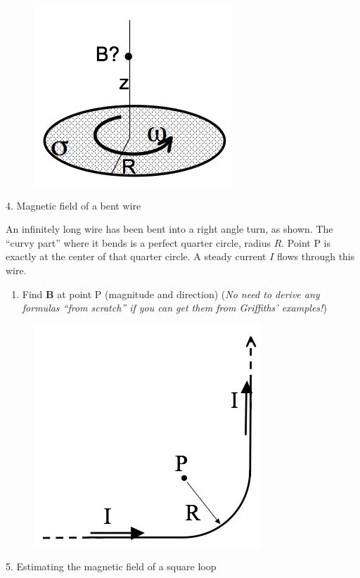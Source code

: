 \documentclass[11pt]{article}
\def\tightlist{}
\begin{document}
\begin{figure}[htbp]
\centering
\includegraphics[width=0.3\linewidth]{./images/hw9/disk.png}
\end{figure}

{\Large 4. Magnetic field of a bent
wire}\label{magnetic-field-of-a-bent-wire}

An infinitely long wire has been bent into a right angle turn, as shown.
The ``curvy part'' where it bends is a perfect quarter circle, radius
\(R\). Point P is exactly at the center of that quarter circle. A steady
current \(I\) flows through this wire.

\begin{enumerate}
\def\labelenumi{\arabic{enumi}.}
\tightlist
\item
  Find \(\mathbf{B}\) at point P (magnitude and direction) (\emph{No
  need to derive any formulas ``from scratch'' if you can get them from
  Griffiths' examples!})
\end{enumerate}

\begin{figure}[htbp]
\centering
\includegraphics[width=0.3\linewidth]{./images/hw9/bent_wire.png}
\end{figure}

{\Large 5. Estimating the magnetic field of a square
loop}\label{estimating-the-magnetic-field-of-a-square-loop}
\end{document}
